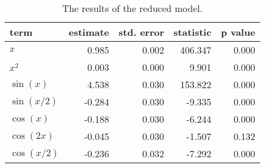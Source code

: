 \begin{table}[t]

\caption{\label{tab:stepwise-regression}The results of the reduced model.}
\centering
\begin{tabular}{lrrrr}
\toprule
term & estimate & std. error & statistic & p value\\
\midrule
\(x\) & 0.985 & 0.002 & 406.347 & 0.000\\
\(x^2\) & 0.003 & 0.000 & 9.901 & 0.000\\
\(\sin(x)\) & 4.538 & 0.030 & 153.822 & 0.000\\
\(\sin(x/2)\) & -0.284 & 0.030 & -9.335 & 0.000\\
\(\cos(x)\) & -0.188 & 0.030 & -6.244 & 0.000\\
\(\cos(2x)\) & -0.045 & 0.030 & -1.507 & 0.132\\
\(\cos(x/2)\) & -0.236 & 0.032 & -7.292 & 0.000\\
\bottomrule
\end{tabular}
\end{table}